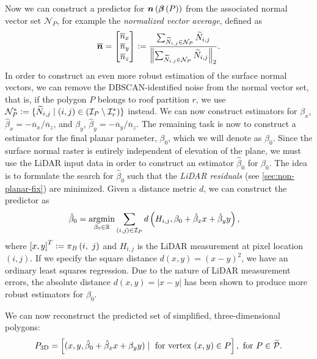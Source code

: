 Now we can construct a predictor for $\boldsymbol{n}\left(\boldsymbol{\beta}\left(P\right)\right)$ from the associated normal vector set $\mathcal{N}_P$, for example the \textit{normalized vector average}, defined as
\begin{equation*}
  \overline{\boldsymbol{n}}
  =
  \begin{bmatrix}
    \overline{n}_x\\
    \overline{n}_y\\
    \overline{n}_z
  \end{bmatrix}
  \vcentcolon=
  \frac{
    \sum_{\widetilde{N}_{i,j} \in \mathcal{N}_P} \widetilde{N}_{i,j}
  }{
    \left\lVert\sum_{\widetilde{N}_{i,j} \in \mathcal{N}_P} \widetilde{N}_{i,j}\right\rVert_2
  }.
\end{equation*}
In order to construct an even more robust estimation of the surface normal vectors, we can remove the DBSCAN-identified noise from the normal vector set, that is, if the polygon $P$ belongs to roof partition $r$, we use $\mathcal{N}_{P}^* \vcentcolon= \{\widetilde{N}_{i,j} \mid (i,j) \in (\mathcal{I}_P \setminus \mathcal{I}_r^*) \}$ instead.
We can now construct estimators for $\beta_x$, $\hat{\beta}_x = -\overline{n}_x / \overline{n}_z$, and $\beta_y$, $\hat{\beta}_y = -\overline{n}_y / \overline{n}_z$.
The remaining task is now to construct a estimator for the final planar parameter, $\beta_0$, which we will denote as $\hat{\beta}_0$.
Since the surface normal raster is entirely independent of elevation of the plane, we must use the LiDAR input data in order to construct an estimator $\hat{\beta}_0$ for $\beta_0$.
The idea is to formulate the search for $\hat{\beta}_0$ such that the \textit{LiDAR residuals} (see \cref{sec:non-planar-fix}) are minimized.
Given a distance metric $d$, we can construct the predictor as
\begin{align*}
  \hat{\beta}_0
  &=
  \operatorname*{\arg\!\min}_{\beta_0 \in \mathbb{R}}
  \sum_{(i,j) \in \mathcal{I}_P}
  d\left(
    H_{i,j},
    \beta_0 + \hat{\beta}_x x + \hat{\beta}_y y
  \right),
\end{align*}
where ${[x, y]}^T \vcentcolon= \pi_{B}\left(i,~j\right)$ and $H_{i,j}$ is the LiDAR measurement at pixel location $(i,j)$.
If we specify the square distance $d(x, y) = (x - y)^2$, we have an ordinary least squares regression.
Due to the nature of LiDAR measurement errors, the absolute distance $d(x, y) = |x - y|$ has been shown to produce more robust estimators for $\beta_0$.

We can now reconstruct the predicted set of simplified, three-dimensional polygons:
\begin{equation*}
  P_{\mathrm{3D}}
  =
  \left[
    (x, y, \hat{\beta}_0 + \hat{\beta}_x x + \beta_y y)
    \mid
    \text{ for vertex } (x, y) \in P
  \right],
  \text{ for } P \in \widetilde{\mathcal{P}}.
\end{equation*}
